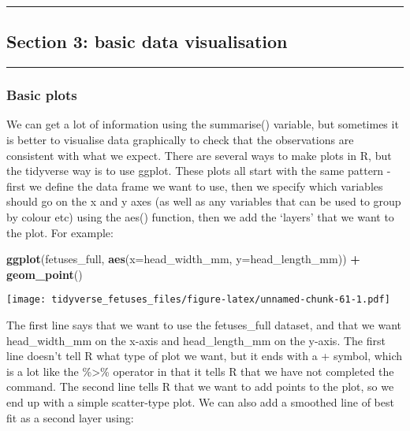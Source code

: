 \documentclass[
]{article}
\newenvironment{Shaded}{\begin{snugshade}}{\end{snugshade}}
\newcommand{\DataTypeTok}[1]{\textcolor[rgb]{0.13,0.29,0.53}{#1}}
\newcommand{\KeywordTok}[1]{\textcolor[rgb]{0.13,0.29,0.53}{\textbf{#1}}}
\newcommand{\NormalTok}[1]{#1}
\newcommand{\OperatorTok}[1]{\textcolor[rgb]{0.81,0.36,0.00}{\textbf{#1}}}
\newcommand{\StringTok}[1]{\textcolor[rgb]{0.31,0.60,0.02}{#1}}
\begin{document}
\begin{center}\rule{0.5\linewidth}{0.5pt}\end{center}

\hypertarget{section-3-basic-data-visualisation}{%
\subsection{Section 3: basic data
visualisation}\label{section-3-basic-data-visualisation}}

\begin{center}\rule{0.5\linewidth}{0.5pt}\end{center}

\hypertarget{basic-plots}{%
\subsubsection{Basic plots}\label{basic-plots}}

We can get a lot of information using the summarise() variable, but
sometimes it is better to visualise data graphically to check that the
observations are consistent with what we expect. There are several ways
to make plots in R, but the tidyverse way is to use ggplot. These plots
all start with the same pattern - first we define the data frame we want
to use, then we specify which variables should go on the x and y axes
(as well as any variables that can be used to group by colour etc) using
the aes() function, then we add the `layers' that we want to the plot.
For example:

\begin{Shaded}
\begin{Highlighting}[]
\KeywordTok{ggplot}\NormalTok{(fetuses_full, }\KeywordTok{aes}\NormalTok{(}\DataTypeTok{x=}\NormalTok{head_width_mm, }\DataTypeTok{y=}\NormalTok{head_length_mm)) }\OperatorTok{+}
\StringTok{    }\KeywordTok{geom_point}\NormalTok{()}
\end{Highlighting}
\end{Shaded}

\texttt{[image: tidyverse\_fetuses\_files/figure-latex/unnamed-chunk-61-1.pdf]}

The first line says that we want to use the fetuses\_full dataset, and
that we want head\_width\_mm on the x-axis and head\_length\_mm on the
y-axis. The first line doesn't tell R what type of plot we want, but it
ends with a + symbol, which is a lot like the \%\textgreater\% operator
in that it tells R that we have not completed the command. The second
line tells R that we want to add points to the plot, so we end up with a
simple scatter-type plot. We can also add a smoothed line of best fit as
a second layer using:
\end{document}
